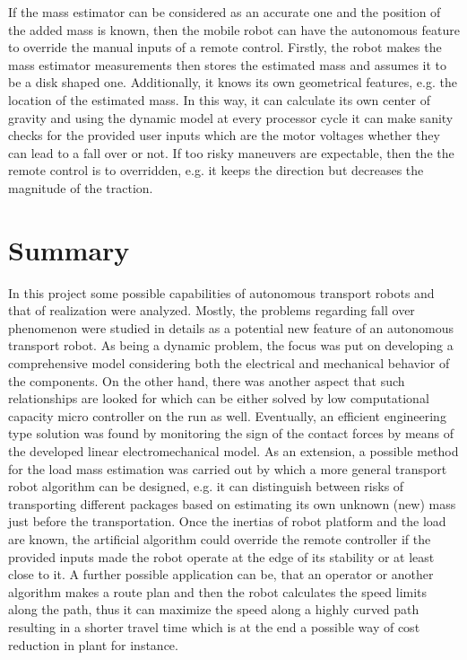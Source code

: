 \documentclass[12pt,english,twoside]{article}
\begin{document}
If the mass estimator can be considered as an accurate one and the position of the added mass is known, then the mobile robot can have the autonomous feature to override the manual inputs of a remote control. Firstly, the robot makes the mass estimator measurements then stores the estimated mass and assumes it to be a disk shaped one. Additionally, it knows its own geometrical features, e.g. the location of the estimated mass. In this way, it can calculate its own center of gravity and using the dynamic model at every processor cycle it can make sanity checks for the provided user inputs which are the motor voltages whether they can lead to a fall over or not. If too risky maneuvers are expectable, then the the remote control is to overridden, e.g. it keeps the direction but decreases the magnitude of the traction.



\newpage
\newpage
\section*{Summary}
In this project some possible capabilities of autonomous transport robots and that of realization were analyzed. Mostly, the problems regarding fall over phenomenon were studied in details as a potential new feature of an autonomous transport robot. 
As being a dynamic problem, the focus was put on developing a comprehensive model considering both the electrical and mechanical behavior of the components. On the other hand, there was another aspect that such relationships are looked for which can be either solved by low computational capacity micro controller on the run as well. Eventually, an efficient engineering type solution was found by monitoring the sign of the contact forces by means of the developed linear electromechanical model. As an extension, a possible method for the load mass estimation was carried out by which a more general transport robot algorithm can be designed, e.g. it can distinguish between risks of transporting different packages based on estimating its own unknown (new) mass just before the transportation. Once the inertias of robot platform and the load are known, the artificial algorithm could override the remote controller if the provided inputs made the robot operate at the edge of its stability or at least close to it. A further possible application can be, that an operator or another algorithm makes a route plan and then the robot calculates the speed limits along the path, thus it can maximize the speed along a highly curved path resulting in a shorter travel time which is at the end a possible way of cost reduction in plant for instance.
\end{document}
